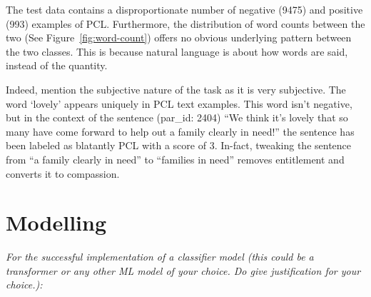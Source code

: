 \documentclass[11pt,a4paper]{article}
\begin{document}

The test data contains a disproportionate number of negative (9475) and positive (993) examples of PCL. Furthermore, the distribution of word counts between the two (See Figure~\ref{fig:word-count}) offers no obvious underlying pattern between the two classes. This is because natural language is about how words are said, instead of the quantity. 

Indeed, \citet{perez-almendros-etal-2020-dont} mention the subjective nature of the task as it is very subjective. The word `lovely' appears uniquely in PCL text examples. This word isn't negative, but in the context of the sentence (par\_id: 2404) ``We think it's lovely that so many have come forward to help out a family clearly in need!'' the sentence has been labeled as blatantly PCL with a score of 3. In-fact, tweaking the sentence from ``a family clearly in need'' to ``families in need'' removes entitlement and converts it to compassion. 

\section{Modelling}

\emph{For the successful implementation of a classifier model (this could be a transformer or any other ML model of your choice. Do give justification for your choice.):}
\end{document}
